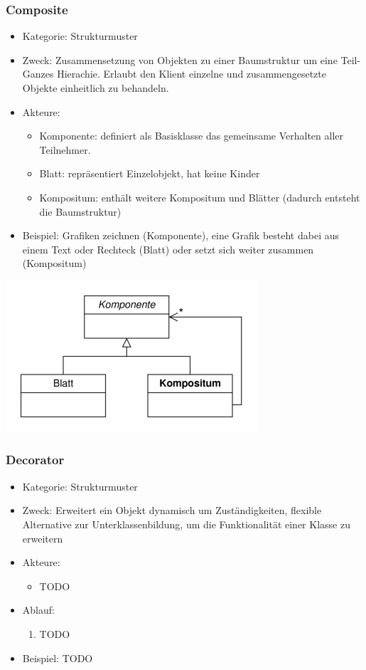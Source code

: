 \documentclass[11pt, fleqn, a4paper, leqno]{scrartcl} %
\begin{document}
		\subsubsection{Composite}
			\begin{itemize}
				\item Kategorie: Strukturmuster
				\item Zweck: Zusammensetzung von Objekten zu einer Baumstruktur um eine Teil-Ganzes Hierachie. Erlaubt den Klient einzelne und zusammengesetzte Objekte einheitlich zu behandeln.
				\item Akteure: 
					\begin{itemize}
						\item Komponente: definiert als Basisklasse das gemeinsame Verhalten aller Teilnehmer.
						\item Blatt: repräsentiert Einzelobjekt, hat keine Kinder
						\item Kompositum: enthält weitere Kompositum und Blätter (dadurch entsteht die Baumstruktur)
					\end{itemize}
				\item Beispiel: Grafiken zeichnen (Komponente), eine Grafik besteht dabei aus einem Text oder Rechteck (Blatt) oder setzt sich weiter zusammen (Kompositum)
			\end{itemize}
			\includegraphics[scale=0.7]{images/composite.png}
			\newpage
		\subsubsection{Decorator}
			\begin{itemize}
				\item Kategorie: Strukturmuster
				\item Zweck: Erweitert ein Objekt dynamisch um Zuständigkeiten, flexible Alternative zur Unterklassenbildung, um die Funktionalität einer Klasse zu erweitern
				\item Akteure: 
					\begin{itemize}
						\item TODO
					\end{itemize}
				\item Ablauf:
					\begin{enumerate}
						\item TODO
					\end{enumerate}
				\item Beispiel: TODO
			\end{itemize}
			\newpage
\end{document}
